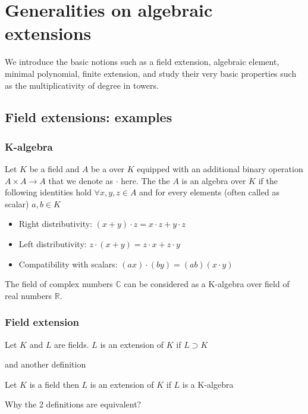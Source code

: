 \chapter{Generalities on algebraic extensions}
We introduce the basic notions such as a field extension, algebraic
element, minimal polynomial, finite extension, and study their very
basic properties such as the multiplicativity of degree in towers. 

\section{Field extensions: examples}

\subsection{K-algebra}
\begin{definition}[K-algebra]
  Let $K$ be a field and $A$ be a  over $K$
  equipped with 
  an additional binary operation $A \times A \rightarrow A$ that we
  denote as $\cdot$ here. The the $A$ is an algebra over $K$ if the
  following identities hold $\forall x,y,z \in A$ and for every
  elements (often called as scalar) $a, b \in K$
  \begin{itemize}
  \item Right distributivity:
    $(x + y) \cdot z = x \cdot z + y \cdot z$
  \item Left distributivity:
    $z \cdot (x + y) = z \cdot x + z \cdot y$
  \item Compatibility with scalars:
    $(ax) \cdot (by) = (ab) (x \cdot y)$
  \end{itemize}
  \label{def:kalgebra}
\end{definition}

\begin{example}
  The field of complex numbers $\mathbb{C}$ can be considered as a
  K-algebra over field of real numbers $\mathbb{R}$.
  \label{ex:complexnumbers}
\end{example}

\subsection{Field extension}

\begin{definition}
  Let $K$ and $L$ are fields.
  $L$ is an extension of $K$ if $L \supset K$
  \label{def:fextension1}
\end{definition}
and another definition
\begin{definition}
  Let $K$ is a field then
  $L$ is an extension of $K$ if $L$ is a K-algebra
  \label{def:fextension2}
\end{definition}
Why the 2 definitions are equivalent?

